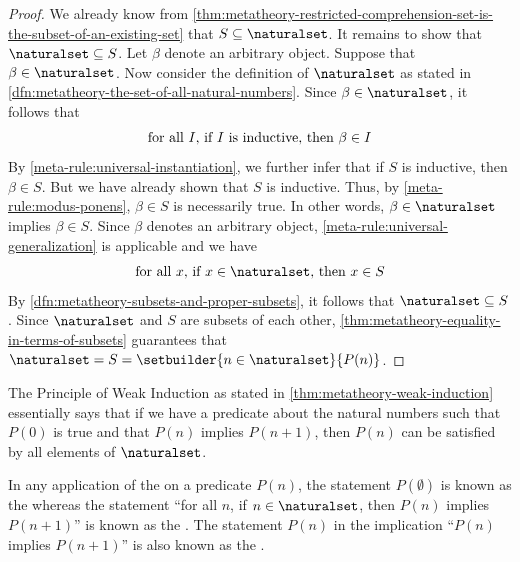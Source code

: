 \begin{proof}
    \vspace{0.3cm}
    \noindent
    We already know from \cref{thm:metatheory-restricted-comprehension-set-is-the-subset-of-an-existing-set} that \( S \subseteq \naturalset \).
    It remains to show that \( \naturalset \subseteq S \).
    Let \( \beta \) denote an arbitrary object.
    Suppose that \( \beta \in \naturalset \).
    Now consider the definition of \( \naturalset \) as stated in \cref{dfn:metatheory-the-set-of-all-natural-numbers}.
    Since \( \beta \in \naturalset \), it follows that
    \begin{equation*}
        \text{for all \( I \), if \( I \) is inductive, then \( \beta \in I \)}
    \end{equation*}
    By \cref{meta-rule:universal-instantiation}, we further infer that if \( S \) is inductive, then \( \beta \in S \).
    But we have already shown that \( S \) is inductive. Thus, by \cref{meta-rule:modus-ponens}, \( \beta \in S \) is necessarily true.
    In other words, \( \beta \in \naturalset \) implies \( \beta \in S \).
    Since \( \beta \) denotes an arbitrary object, \cref{meta-rule:universal-generalization} is applicable and we have
    \begin{equation*}
        \text{for all \( x \), if \( x \in \naturalset \), then \( x \in S \)}
    \end{equation*}
    By \cref{dfn:metatheory-subsets-and-proper-subsets}, it follows that \( \naturalset \subseteq S \).
    Since \( \naturalset \) and \( S \) are subsets of each other, \cref{thm:metatheory-equality-in-terms-of-subsets} guarantees that
    \( \naturalset = S = \setbuilder{n \in \naturalset}{P(n)} \).
\end{proof}

\begin{rem}
    The Principle of Weak Induction as stated in \cref{thm:metatheory-weak-induction} essentially says that if we have a
    predicate about the natural numbers such that \( P(0) \) is true and that \( P(n) \) implies \( P(n + 1) \),
    then \( P(n) \) can be satisfied by all elements of \( \naturalset \).
\end{rem}

\begin{dfn}
     \label{dfn:metatheory-base-case-and-inductive-step-induction-hypothesis}
    In any application of the  on a predicate \( P(n) \),
    the statement \( P(\emptyset) \) is known as the  whereas
    the statement ``for all \( n \), if \( n \in \naturalset \), then \( P(n) \) implies \( P(n + 1) \)''
    is known as the .
    The statement \( P(n) \) in the implication ``\( P(n) \) implies \( P(n + 1)\)'' is also known as the .
\end{dfn}

